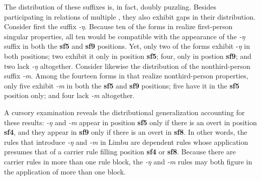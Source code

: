 \documentclass[output=paper,
modfonts
]{LSP/langsci}
\begin{document}
The distribution of these suffixes is, in fact, doubly puzzling.  Besides participating in relations of multiple , they also exhibit gaps in their distribution.  Consider first the suffix \textit{\nobreakdash-ŋ}.  Because ten of the forms in  realize first\nobreakdash-person singular  properties, all ten would be compatible with the appearance of the \textit{\nobreakdash-ŋ} suffix in both the \textbf{sf5} and \textbf{sf9} positions.  Yet, only two of the forms exhibit \nobreakdash-\textit{ŋ} in both positions; two exhibit it only in position \textbf{sf5}; four, only in postion \textbf{sf9}; and two lack \textit{\nobreakdash-ŋ} altogether.  Consider likewise the distribution of the nonthird\nobreakdash-person   suffix \textit{\nobreakdash-m}.  Among the fourteen forms in  that realize nonthird\nobreakdash-person   properties, only five exhibit \textit{\nobreakdash-m} in both the \textbf{sf5} and \textbf{sf9} positions; five have it in the \textbf{sf5} position only; and four lack \textit{\nobreakdash-m} altogether.

A cursory examination reveals the distributional generalization accounting for these results:  \textit{\nobreakdash-ŋ} and \textit{\nobreakdash-m} appear in position \textbf{sf5} only if there is an overt  in position \textbf{sf4}, and they appear in \textbf{sf9} only if there is an overt  in \textbf{sf8}.  In other words, the rules that introduce \textit{\nobreakdash-ŋ} and \textit{\nobreakdash-m} in Limbu are dependent rules whose application presumes that of a carrier rule filling position \textbf{sf4} or \textbf{sf8}. Because there are carrier rules in more than one rule block, the \textit{\nobreakdash-ŋ} and \textit{\nobreakdash-m} rules may both figure in the application of more than one block.
\end{document}
